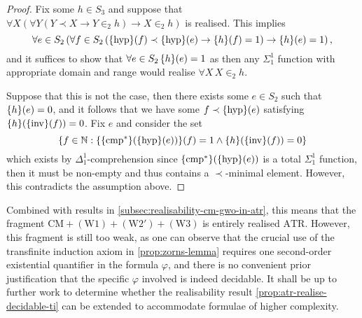 \documentclass[11pt]{article}
\theoremstyle{plain}
\theoremstyle{definition}
\begin{document}
\begin{proof}
    Fix some $h \in S_3$ and suppose that $\forall X \left(\forall Y \left(Y \prec X \rightarrow Y \in_2 h\right) \rightarrow X \in_2 h\right)$ is realised. This implies
    \[\forall e \in S_2 \left(\forall f \in S_2 \left(\mleft\{\mathrm{hyp}\mright\}\mleft(f\mright) \prec \mleft\{\mathrm{hyp}\mright\}\mleft(e\mright) \rightarrow \mleft\{h\mright\}\mleft(f\mright) = 1\right) \rightarrow \mleft\{h\mright\}\mleft(e\mright) = 1\right),\]
    and it suffices to show that $\forall e \in S_2 \, \mleft\{h\mright\}\mleft(e\mright) = 1$ as then any $\Sigma^1_1$ function with appropriate domain and range would realise $\forall X \, X \in_2 h$.

    Suppose that this is not the case, then there exists some $e \in S_2$ such that $\mleft\{h\mright\}\mleft(e\mright) = 0$, and it follows that we have some $f \prec \mleft\{\mathrm{hyp}\mright\}\mleft(e\mright)$ satisfying $\mleft\{h\mright\}\mleft(\mleft\{\mathrm{inv}\mright\}\mleft(f\mright)\mright) = 0$. Fix $e$ and consider the set
    \[\left\{f \in \mathbb{N} : \mleft\{\mleft\{\mathrm{cmp}^*\mright\}\mleft(\mleft\{\mathrm{hyp}\mright\}\mleft(e\mright)\mright)\mright\}\mleft(f\mright) = 1 \land \mleft\{h\mright\}\mleft(\mleft\{\mathrm{inv}\mright\}\mleft(f\mright)\mright) = 0\right\}\]
    which exists by $\Delta^1_1$-comprehension since $\mleft\{\mathrm{cmp}^*\mright\}\mleft(\mleft\{\mathrm{hyp}\mright\}\mleft(e\mright)\mright)$ is a total $\Sigma^1_1$ function, then it must be non-empty and thus contains a $\prec$-minimal element. However, this contradicts the assumption above.
\end{proof}

Combined with results in \autoref{subsec:realisability-cm-gwo-in-atr}, this means that the fragment $\mathrm{CM} + \left(\mathrm{W}1\right) + \left(\mathrm{W}2'\right) + \left(\mathrm{W}3\right)$ is entirely realised $\mathrm{ATR}$. However, this fragment is still too weak, as one can observe that the crucial use of the transfinite induction axiom in \autoref{prop:zorns-lemma} requires one second-order existential quantifier in the formula $\varphi$, and there is no convenient prior justification that the specific $\varphi$ involved is indeed decidable. It shall be up to further work to determine whether the realisability result \autoref{prop:atr-realise-decidable-ti} can be extended to accommodate formulae of higher complexity.

\bibmain
\end{document}
